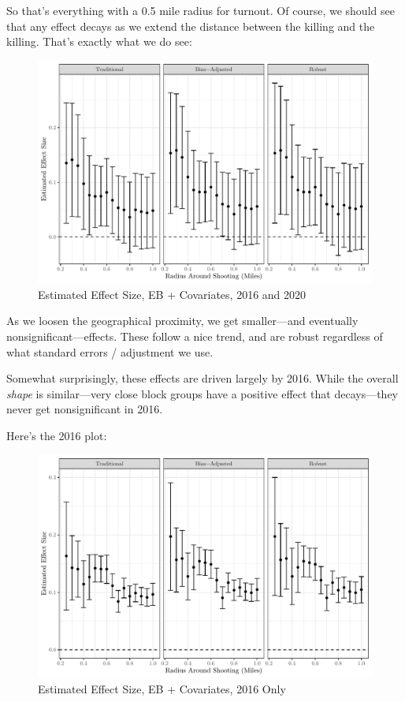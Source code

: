 \documentclass[
  12pt,
]{article}
\begin{document}
So that's everything with a 0.5 mile radius for turnout. Of course, we should see that any effect decays as we extend the distance between the killing and the killing. That's exactly what we do see:

\begin{figure}[H]

{\centering \includegraphics{shoot_to_files/figure-latex/dists-chunk-1} 

}

\caption{\label{fig:map}Estimated Effect Size, EB + Covariates, 2016 and 2020}\label{fig:dists-chunk}
\end{figure}

As we loosen the geographical proximity, we get smaller---and eventually nonsignificant---effects. These follow a nice trend, and are robust regardless of what standard errors / adjustment we use.

Somewhat surprisingly, these effects are driven largely by 2016. While the overall \emph{shape} is similar---very close block groups have a positive effect that decays---they never get nonsignificant in 2016.

Here's the 2016 plot:

\begin{figure}[H]

{\centering \includegraphics{shoot_to_files/figure-latex/dists-chunk16-1} 

}

\caption{\label{fig:map}Estimated Effect Size, EB + Covariates, 2016 Only}\label{fig:dists-chunk16}
\end{figure}
\end{document}
